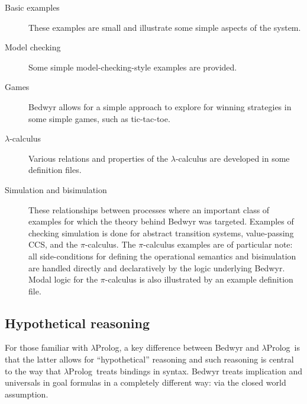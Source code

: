 \documentclass{article}
\newcommand{\lp}{$\lambda$Prolog}
\begin{document}
\begin{description}
\item[Basic examples] These examples are small and illustrate some
  simple aspects of the system.

\item[Model checking] Some simple model-checking-style examples are
  provided. 

\item[Games] Bedwyr allows for a simple approach to explore for
  winning strategies in some simple games, such as tic-tac-toe.

\item[$\lambda$-calculus] Various relations and properties of the
  $\lambda$-calculus are developed in some definition files.

\item[Simulation and bisimulation] These relationships between
  processes where an important class of examples for which the theory
  behind Bedwyr was targeted.  Examples of checking simulation is done
  for abstract transition systems, value-passing CCS, and the
  $\pi$-calculus.  The $\pi$-calculus examples are of particular note:
  all side-conditions for defining the operational semantics and
  bisimulation are handled directly and declaratively by the logic
  underlying Bedwyr.   Modal logic for the $\pi$-calculus is also
  illustrated by an example definition file.

\end{description}

\subsection{Hypothetical reasoning}

For those familiar with \lp, a key difference between
Bedwyr and \lp\ is that the latter allows for ``hypothetical''
reasoning and such reasoning is central to the way that \lp\ treats
bindings in syntax.    Bedwyr treats implication and universals in
goal formulas in a completely different way: via the closed world
assumption.  
\end{document}
